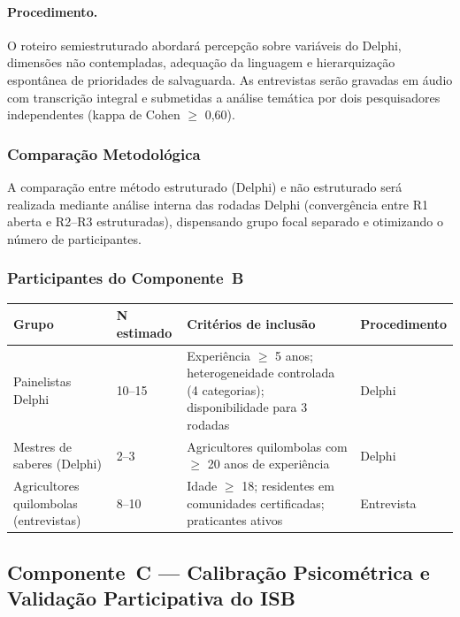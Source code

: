 \documentclass[12pt,a4paper,brazil]{article}
\begin{document}
\paragraph{Procedimento.} O roteiro semiestruturado abordará percepção sobre variáveis do Delphi, dimensões não contempladas, adequação da linguagem e hierarquização espontânea de prioridades de salvaguarda. As entrevistas serão gravadas em áudio com transcrição integral e submetidas a análise temática por dois pesquisadores independentes (kappa de Cohen $\geq$ 0,60).

\subsubsection{Comparação Metodológica}

A comparação entre método estruturado (Delphi) e não estruturado será realizada mediante análise interna das rodadas Delphi (convergência entre R1 aberta e R2--R3 estruturadas), dispensando grupo focal separado e otimizando o número de participantes.

\subsubsection{Participantes do Componente~B}

\begin{longtable}{p{4cm}p{2.5cm}p{5.5cm}p{2cm}}
\toprule
\textbf{Grupo} & \textbf{N estimado} & \textbf{Critérios de inclusão} & \textbf{Procedimento} \\
\midrule
\endhead
Painelistas Delphi & 10--15 & Experiência $\geq$ 5 anos; heterogeneidade controlada (4 categorias); disponibilidade para 3 rodadas & Delphi \\
Mestres de saberes (Delphi) & 2--3 & Agricultores quilombolas com $\geq$ 20 anos de experiência & Delphi \\
Agricultores quilombolas (entrevistas) & 8--10 & Idade $\geq$ 18; residentes em comunidades certificadas; praticantes ativos & Entrevista \\
\bottomrule
\end{longtable}


\subsection{Componente~C --- Calibração Psicométrica e Validação Participativa do ISB}
\end{document}
